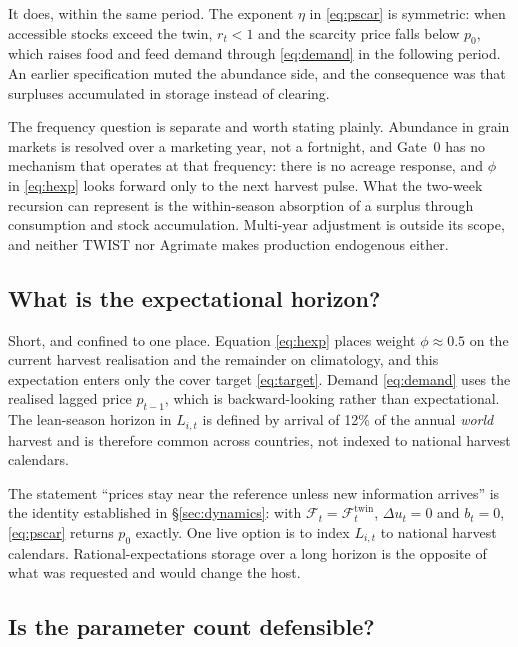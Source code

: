 It does, within the same period. The exponent \(\eta\) in \eqref{eq:pscar}
is symmetric: when accessible stocks exceed the twin, \(r_t<1\) and the
scarcity price falls below \(p_0\), which raises food and feed demand
through \eqref{eq:demand} in the following period. An earlier
specification muted the abundance side, and the consequence was that
surpluses accumulated in storage instead of clearing.

The frequency question is separate and worth stating plainly. Abundance in
grain markets is resolved over a marketing year, not a fortnight, and
Gate~0 has no mechanism that operates at that frequency: there is no
acreage response, and \(\phi\) in \eqref{eq:hexp} looks forward only to the
next harvest pulse. What the two-week recursion can represent is the
within-season absorption of a surplus through consumption and stock
accumulation. Multi-year adjustment is outside its scope, and neither TWIST
\citep{schewe2017} nor Agrimate \citep{kuhla2025} makes production
endogenous either.

\subsection{What is the expectational horizon?}

Short, and confined to one place. Equation \eqref{eq:hexp} places weight
\(\phi\approx 0.5\) on the current harvest realisation and the remainder on
climatology, and this expectation enters only the cover target
\eqref{eq:target}. Demand \eqref{eq:demand} uses the realised lagged price
\(p_{t-1}\), which is backward-looking rather than expectational. The
lean-season horizon in \(L_{i,t}\) is defined by arrival of 12\% of the
annual \emph{world} harvest and is therefore common across countries, not
indexed to national harvest calendars.

The statement ``prices stay near the reference unless new information
arrives'' is the identity established in \S\ref{sec:dynamics}: with
\(\mathcal{F}_t=\mathcal{F}^{\mathrm{twin}}_t\), \(\Delta u_t=0\) and
\(b_t=0\), \eqref{eq:pscar} returns \(p_0\) exactly. One live option is to
index \(L_{i,t}\) to national harvest calendars. Rational-expectations
storage over a long horizon \citep{deaton1992} is the opposite of what was
requested and would change the host.

\subsection{Is the parameter count defensible?}


